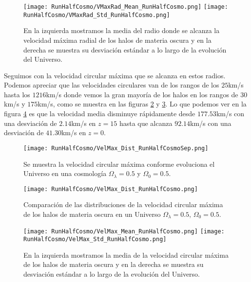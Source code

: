 \begin{figure}[H]
    \centering
    \texttt{[image: RunHalfCosmo/VMaxRad\_Mean\_RunHalfCosmo.png]}
    \texttt{[image: RunHalfCosmo/VMaxRad\_Std\_RunHalfCosmo.png]}
    \caption[Media y desviación estándar del Radio donde se alcanza la velocidad máxima radial]{\footnotesize En la izquierda mostramos la media del radio donde se alcanza la velocidad máxima radial de los halos de materia oscura y en la derecha se muestra su desviación estándar a lo largo de la evolución del Universo.}
    \label{fig:HalfCosmo-VMaxRadStats}
\end{figure}

Seguimos con la velocidad circular máxima que se alcanza en estos radios. Podemos apreciar que las velocidades circulares van de los rangos de los $25$km/s hasta los $1216$km/s donde vemos la gran mayoría de los halos en los rangos de $30$km/s y $175$km/s, como se muestra en las figuras \ref{fig:HalfCosmo-VelMaxDistSep} y \ref{fig:HalfCosmo-VelMaxDist}. Lo que podemos ver en la figura \ref{fig:HalfCosmo-VelMaxStats} es que la velocidad  media disminuye rápidamente desde $177.53$km/s con una desviación de $2.14$km/s en $z=15$ hasta que alcanza $92.14$km/s con una desviación de $41.30$km/s en $z=0$. 

\begin{figure}[H]
    \centering
    \texttt{[image: RunHalfCosmo/VelMax\_Dist\_RunHalfCosmoSep.png]}
    \caption[Velocidad circular máxima]{\footnotesize Se muestra la velocidad circular máxima conforme evoluciona el Universo en una cosmología $\Omega_\lambda = 0.5 $ y $\Omega_0 = 0.5$.}
    \label{fig:HalfCosmo-VelMaxDistSep}
\end{figure}

\begin{figure}[H]
    \centering
    \texttt{[image: RunHalfCosmo/VelMax\_Dist\_RunHalfCosmo.png]}
    \caption[Distribución de la velocidad circular máxima]{\footnotesize Comparación de las distribuciones de la velocidad circular máxima de los halos de materia oscura en un Universo $\Omega_\lambda = 0.5 $, $\Omega_0 = 0.5$.}
    \label{fig:HalfCosmo-VelMaxDist}
\end{figure}

\begin{figure}[H]
    \centering
    \texttt{[image: RunHalfCosmo/VelMax\_Mean\_RunHalfCosmo.png]}
    \texttt{[image: RunHalfCosmo/VelMax\_Std\_RunHalfCosmo.png]}
    \caption[Media y desviación estándar de la velocidad circular máxima]{\footnotesize En la izquierda mostramos la media de la velocidad circular máxima de los halos de materia oscura y en la derecha se muestra su desviación estándar a lo largo de la evolución del Universo.}
    \label{fig:HalfCosmo-VelMaxStats}
\end{figure}

